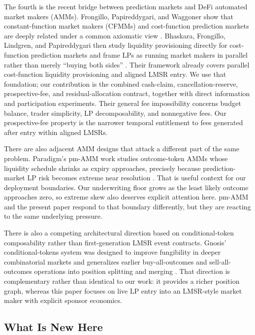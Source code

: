 \documentclass[10pt]{article}
\begin{document}
The fourth is the recent bridge between prediction markets and DeFi automated market makers (AMMs). Frongillo, Papireddygari, and Waggoner show that constant-function market makers (CFMMs) and cost-function prediction markets are deeply related under a common axiomatic view \cite{frongillo2024}. Bhaskara, Frongillo, Lindgren, and Papireddygari then study liquidity provisioning directly for cost-function prediction markets and frame LPs as running market makers in parallel rather than merely ``buying both sides'' \cite{bhaskara2025}. Their framework already covers parallel cost-function liquidity provisioning and aligned LMSR entry. We use that foundation; our contribution is the combined cash-claim, cancellation-reserve, prospective-fee, and residual-allocation contract, together with direct information and participation experiments. Their general fee impossibility concerns budget balance, trader simplicity, LP decomposability, and nonnegative fees. Our prospective-fee property is the narrower temporal entitlement to fees generated after entry within aligned LMSRs.

There are also adjacent AMM designs that attack a different part of the same problem. Paradigm's pm-AMM work studies outcome-token AMMs whose liquidity schedule shrinks as expiry approaches, precisely because prediction-market LP risk becomes extreme near resolution \cite{paradigmpmamm}. That is useful context for our deployment boundaries. Our underwriting floor grows as the least likely outcome approaches zero, so extreme skew also deserves explicit attention here. pm-AMM and the present paper respond to that boundary differently, but they are reacting to the same underlying pressure.

There is also a competing architectural direction based on conditional-token composability rather than first-generation LMSR event contracts. Gnosis' conditional-tokens system was designed to improve fungibility in deeper combinatorial markets and generalizes earlier buy-all-outcomes and sell-all-outcomes operations into position splitting and merging \cite{gnosisctmotivation,gnosisctguide}. That direction is complementary rather than identical to our work: it provides a richer position graph, whereas this paper focuses on live LP entry into an LMSR-style market maker with explicit sponsor economics.

\subsection{What Is New Here}
\end{document}

